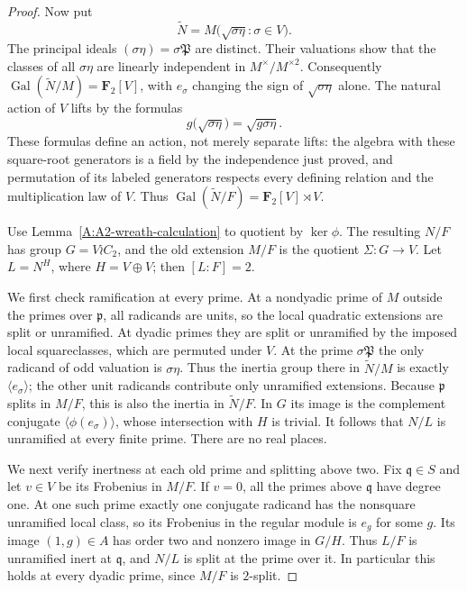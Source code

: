\begin{proof}
Now put
\[
       \widetilde N=M\bigl(\sqrt{\sigma\eta}:\sigma\in V\bigr).
\]
The principal ideals $(\sigma\eta)=\sigma\mathfrak P$ are distinct.
Their valuations show that the classes of all $\sigma\eta$ are
linearly independent in $M^\times/M^{\times2}$. Consequently
$\operatorname{Gal}(\widetilde N/M)=\mathbf F_2[V]$, with $e_\sigma$
changing the sign of $\sqrt{\sigma\eta}$ alone. The natural action
of $V$ lifts by the formulas
\[
 g\bigl(\sqrt{\sigma\eta}\bigr)=\sqrt{g\sigma\eta}.
\]
These formulas define an action, not merely separate lifts: the
algebra with these square-root generators is a field by the
independence just proved, and permutation of its labeled generators
respects every defining relation and the multiplication law of $V$.
Thus $\operatorname{Gal}(\widetilde N/F)=\mathbf F_2[V]\rtimes V$.

Use Lemma~\ref{A:A2-wreath-calculation} to quotient by $\ker\phi$.
The resulting $N/F$ has group $G=V\wr C_2$, and the old extension
$M/F$ is the quotient $\Sigma:G\to V$. Let $L=N^H$, where
$H=V\oplus V$; then $[L:F]=2$.

We first check ramification at every prime. At a nondyadic prime
of $M$ outside the primes over $\mathfrak p$, all radicands are
units, so the local quadratic extensions are split or unramified.
At dyadic primes they are split or unramified by the imposed local
squareclasses, which are permuted under $V$. At the prime
$\sigma\mathfrak P$ the only radicand of odd valuation is
$\sigma\eta$. Thus the inertia group there in
$\widetilde N/M$ is exactly $\langle e_\sigma\rangle$; the other
unit radicands contribute only unramified extensions. Because
$\mathfrak p$ splits in $M/F$, this is also the inertia in
$\widetilde N/F$. In $G$ its image is the complement conjugate
$\langle\phi(e_\sigma)\rangle$, whose intersection with $H$ is
trivial. It follows that $N/L$ is unramified at every finite prime.
There are no real places.

We next verify inertness at each old prime and splitting above two.
Fix $\mathfrak q\in S$ and let $v\in V$ be its Frobenius in $M/F$.
If $v=0$, all the primes above $\mathfrak q$ have degree one. At
one such prime exactly one conjugate radicand has the nonsquare
unramified local class, so its Frobenius in the regular module is
$e_g$ for some $g$. Its image $(1,g)\in A$ has order two and
nonzero image in $G/H$. Thus $L/F$ is unramified inert at
$\mathfrak q$, and $N/L$ is split at the prime over it.
In particular this holds at every dyadic prime, since $M/F$ is
$2$-split.


\end{proof}
